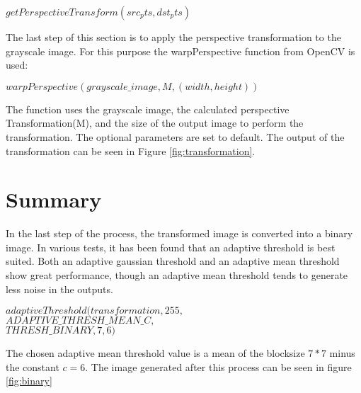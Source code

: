 \documentclass[twocolumn,10pt]{asme2ej}
\begin{document}
\begin{center}
    $getPerspectiveTransform(src_pts, dst_pts)$
\end{center}
The last step of this section is to apply the perspective transformation to the grayscale image. 
For this purpose the warpPerspective function\cite{opencv_warpPerspective} from OpenCV is used:
\begin{center}
    $warpPerspective(grayscale\_image, M, (width, height))$
\end{center}
The function uses the grayscale image, the calculated perspective Transformation(M), and the size of the 
output image to perform the transformation. The optional parameters are set to default.
The output of the transformation can be seen in Figure \ref{fig:transformation}.





\section{Summary}
\noindent
In the last step of the process, the transformed image is converted into a binary image.
In various tests, it has been found that an adaptive threshold\cite{opencv_adaptivethreshold} is best suited.
Both an adaptive gaussian threshold\cite{opencv_adaptivetypes} and an adaptive mean threshold show great performance, 
though an adaptive mean threshold tends to generate less noise in the outputs.

\begin{center}
    \noindent
    $adaptiveThreshold(transformation,255,$\\
    $ADAPTIVE\_THRESH\_MEAN\_C, $\\
    $THRESH\_BINARY,7,6)$
\end{center}
\noindent
 \noindent
The chosen adaptive mean threshold value is a mean of the blocksize $7*7$ minus the constant $c=6$.
The image generated after this process can be seen in figure \ref{fig:binary}
\end{document}
